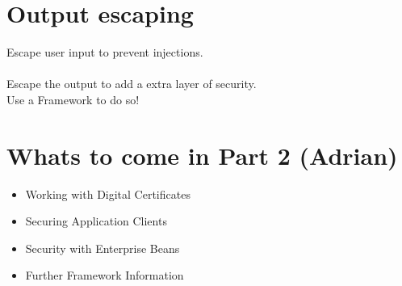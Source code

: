 \documentclass[12pt,a4paper,draft]{report}
\begin{document}
\section{Output escaping}
Escape user input to prevent injections.\\
\\
Escape the output to add a extra layer of security.\\
Use a Framework to do so!\\

\section{Whats to come in Part 2 (Adrian)}
\begin{itemize}
	\item Working with Digital Certificates\\
	\item Securing Application Clients\\
	\item Security with Enterprise Beans\\
	\item Further Framework Information\\
\end{itemize}


\newpage
\end{document}
